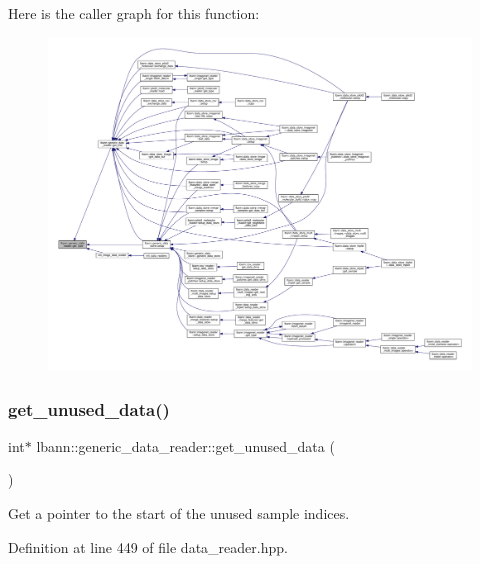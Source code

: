 Here is the caller graph for this function\+:\nopagebreak
\begin{figure}[H]
\begin{center}
\leavevmode
\includegraphics[width=350pt]{classlbann_1_1generic__data__reader_abeb849fb8e10b4fa317c90bc33f61758_icgraph}
\end{center}
\end{figure}
\mbox{\label{classlbann_1_1generic__data__reader_a94e981ee5b34ce56d1a532fed2ba9e39}} 
\subsubsection{\texorpdfstring{get\+\_\+unused\+\_\+data()}{get\_unused\_data()}}
{\footnotesize\ttfamily int$\ast$ lbann\+::generic\+\_\+data\+\_\+reader\+::get\+\_\+unused\+\_\+data (\begin{DoxyParamCaption}{ }\end{DoxyParamCaption})\hspace{0.3cm}{\ttfamily [inline]}}



Get a pointer to the start of the unused sample indices. 



Definition at line 449 of file data\+\_\+reader.\+hpp.


